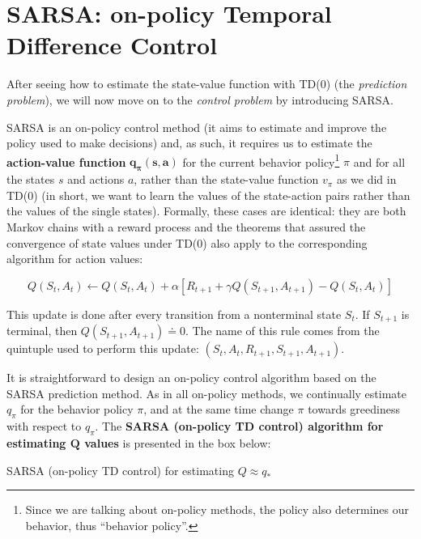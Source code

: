 \section{SARSA: on-policy Temporal Difference Control}
After seeing how to estimate the state-value function with TD(0) (the \textit{prediction problem}), we will now move on to the \textit{control problem} by introducing SARSA.

SARSA is an on-policy control method (it aims to estimate and improve the policy used to make decisions) and, as such, it requires us to estimate the \textbf{action-value function} $\boldsymbol{q_\pi (s,a)}$ for the current behavior policy\footnote{Since we are talking about on-policy methods, the policy also determines our behavior, thus ``behavior policy''.}  $\pi$ and for all the states $s$ and actions $a$, rather than the state-value function $v_\pi$ as we did in TD(0) (in short, we want to learn the values of the state-action pairs rather than the values of the single states). Formally, these cases are identical: they are both Markov chains with a reward process and the theorems that assured the convergence of state values under TD(0) also apply to the corresponding algorithm for action values:

\begin{equation}
    Q(S_t,A_t) \leftarrow Q(S_t,A_t) + \alpha \left[ R_{t+1} + \gamma Q(S_{t+1},A_{t+1}) - Q(S_t,A_t) \right]
    \label{eq:ch5-sarsaupdaterule}
\end{equation}

This update is done after every transition from a nonterminal state $S_t$. If $S_{t+1}$ is terminal, then $Q(S_{t+1},A_{t+1}) \doteq 0$. The name of this rule comes from the quintuple used to perform this update: $\left(S_t,A_t,R_{t+1},S_{t+1},A_{t+1}\right)$.

It is straightforward to design an on-policy control algorithm based on the SARSA prediction method. As in all on-policy methods, we continually estimate $q_\pi$ for the behavior policy $\pi$, and at the same time change $\pi$ towards greediness with respect to $q_\pi$. The \textbf{SARSA (on-policy TD control) algorithm for estimating $\boldsymbol{Q}$ values} is presented in the box below:

\begin{algorithm}[H]
\SetAlgoLined
\Parameters{step size $\alpha \in \left] 0,1 \right]$, small $\varepsilon > 0$}

\caption{SARSA (on-policy TD control) for estimating $Q \approx q_*$}
\end{algorithm}

